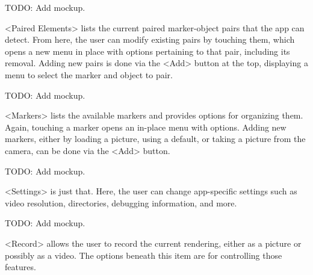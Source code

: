 TODO: Add mockup.

<Paired Elements> lists the current paired marker-object pairs that the app can detect.
From here, the user can modify existing pairs by touching them, which opens a new menu in place with options pertaining to that pair, including its removal.
Adding new pairs is done via the <Add> button at the top, displaying a menu to select the marker and object to pair.

TODO: Add mockup.

<Markers> lists the available markers and provides options for organizing them.
Again, touching a marker opens an in-place menu with options.
Adding new markers, either by loading a picture, using a default, or taking a picture from the camera, can be done via the <Add> button.

TODO: Add mockup.

<Settings> is just that.
Here, the user can change app-specific settings such as video resolution, directories, debugging information, and more.

TODO: Add mockup.

<Record> allows the user to record the current rendering, either as a picture or possibly as a video.
The options beneath this item are for controlling those features.